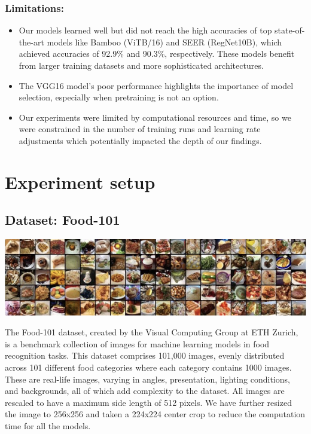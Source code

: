 \documentclass{article}
\begin{document}
\subsubsection{Limitations:}
\begin{itemize}
    \item Our models learned well but did not reach the high accuracies of top state-of-the-art models like Bamboo (ViTB/16) and SEER (RegNet10B), which achieved accuracies of 92.9\% and 90.3\%, respectively. These models benefit from larger training datasets and more sophisticated architectures.
    \item The VGG16 model’s poor performance highlights the importance of model selection, especially when pretraining is not an option.
    \item Our experiments were limited by computational resources and time, so we were constrained in the number of training runs and learning rate adjustments which potentially impacted the depth of our findings.
\end{itemize}


\section{Experiment setup}

\subsection{Dataset: Food-101}

\begin{center}
    \includegraphics[width=1\linewidth]{./images/food101dataset-image.png}
\end{center}

The Food-101 dataset, created by the Visual Computing Group at ETH Zurich, is a benchmark collection of images for machine learning models in food recognition tasks. This dataset comprises 101,000 images, evenly distributed across 101 different food categories where each category contains 1000 images. These are real-life images, varying in angles, presentation, lighting conditions, and backgrounds, all of which add complexity to the dataset. All images are rescaled to have a maximum side length of 512 pixels. We have further resized the image to 256x256 and taken a 224x224 center crop to reduce the computation time for all the models.
\end{document}
